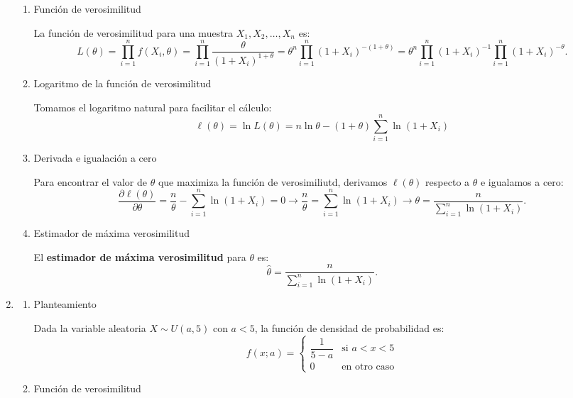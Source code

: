 \begin{enumerate}[label=\color{red}\textbf{\arabic*)}]
    \begin{enumerate}[label=\arabic*)]
        \item Función de verosimilitud

            La función de verosimilitud para una muestra $X_1,X_2,\dots,X_n$ es: \[
            L(\theta)=\prod_{i=1}^{n} f(X_i,\theta)=\prod_{i=1}^{n} \dfrac{\theta}{(1+X_i)^{1+\theta}}=\theta^n \prod_{i=1}^{n} (1+X_i)^{-(1+\theta)} =\theta^n \prod_{i=1}^{n} (1+X_i)^{-1}\prod_{i=1}^{n} (1+X_i)^{-\theta}   . 
            \] 
        \item Logaritmo de la función de verosimilitud

            Tomamos el logaritmo natural para facilitar el cálculo: \[
            \ell(\theta)=\ln L(\theta)=n\ln\theta-(1+\theta)\sum_{i=1}^{n} \ln(1+X_i)
            \] 
        \item Derivada e igualación a cero

            Para encontrar el valor de $\theta$ que maximiza la función de verosimiliutd, derivamos $\ell(\theta)$ respecto a $\theta$ e igualamos a cero: \[
            \frac{\partial \ell(\theta)}{\partial \theta}=\dfrac{n}{\theta}-\sum_{i=1}^{n} \ln(1+X_i)=0\longrightarrow \dfrac{n}{\theta}=\sum_{i=1}^{n} \ln(1+X_i)\longrightarrow \theta=\dfrac{n}{\sum_{i=1}^{n} \ln(1+X_i)} .
            \] 
        \item Estimador de máxima verosimilitud

            El \textbf{estimador de máxima verosimilitud} para $\theta$ es: \[
            \hat{\theta}=\dfrac{n}{\sum_{i=1}^{n} \ln(1+X_i)}.
            \] 
             
    \end{enumerate}

    \item {} 

        \begin{enumerate}[label=\arabic*)]
            \item Planteamiento

                Dada la variable aleatoria $X\sim U(a,5)$ con $a<5$, la función de densidad de probabilidad es: \[
                f(x;a)=\begin{cases}
                    \dfrac{1}{5-a} & \text{si }a<x<5\\
                    0 & \text{en otro caso}
                \end{cases}
                \] 
            \item Función de verosimilitud


\end{enumerate}
\end{enumerate}
